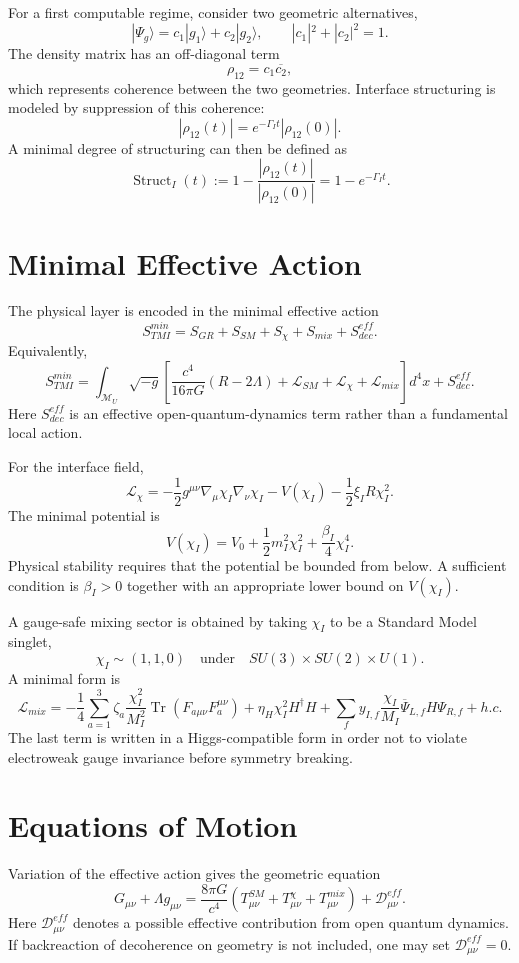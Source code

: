 \documentclass[12pt,a4paper]{article}
\DeclareMathOperator{\Struct}{Struct}
\DeclareMathOperator{\Tr}{Tr}
\newcommand{\M}{\mathcal M_U}
\newcommand{\Lag}{\mathcal L}
\begin{document}
For a first computable regime, consider two geometric alternatives,
\[
|\Psi_g\rangle=c_1|g_1\rangle+c_2|g_2\rangle,
\qquad |c_1|^2+|c_2|^2=1.
\]
The density matrix has an off-diagonal term
\[
\rho_{12}=c_1\overline{c_2},
\]
which represents coherence between the two geometries. Interface structuring is modeled by suppression of this coherence:
\[
\boxed{
|\rho_{12}(t)|=e^{-\Gamma_I t}|\rho_{12}(0)|.
}
\]
A minimal degree of structuring can then be defined as
\[
\boxed{
\Struct_I(t):=1-\frac{|\rho_{12}(t)|}{|\rho_{12}(0)|}=1-e^{-\Gamma_I t}.
}
\]

\section{Minimal Effective Action}
The physical layer is encoded in the minimal effective action
\[
\boxed{
S_{TMI}^{min}=S_{GR}+S_{SM}+S_\chi+S_{mix}+S_{dec}^{eff}.
}
\]
Equivalently,
\[
\boxed{
S_{TMI}^{min}
=
\int_{\M}\sqrt{-g}\left[
\frac{c^4}{16\pi G}(R-2\Lambda)
+\Lag_{SM}+\Lag_\chi+\Lag_{mix}
\right]d^4x
+S_{dec}^{eff}.
}
\]
Here $S_{dec}^{eff}$ is an effective open-quantum-dynamics term rather than a fundamental local action.

For the interface field,
\[
\boxed{
\Lag_\chi
=-\frac12 g^{\mu\nu}\nabla_\mu\chi_I\nabla_\nu\chi_I
-V(\chi_I)-\frac12\xi_I R\chi_I^2.
}
\]
The minimal potential is
\[
\boxed{
V(\chi_I)=V_0+\frac12 m_I^2\chi_I^2+\frac{\beta_I}{4}\chi_I^4.
}
\]
Physical stability requires that the potential be bounded from below. A sufficient condition is $\beta_I>0$ together with an appropriate lower bound on $V(\chi_I)$.

A gauge-safe mixing sector is obtained by taking $\chi_I$ to be a Standard Model singlet,
\[
\chi_I\sim (1,1,0)
\quad \text{under}\quad SU(3)\times SU(2)\times U(1).
\]
A minimal form is
\[
\boxed{
\Lag_{mix}
=
-\frac14\sum_{a=1}^{3}\zeta_a\frac{\chi_I^2}{M_I^2}\Tr(F_{a\mu\nu}F_a^{\mu\nu})
+\eta_H\chi_I^2H^\dagger H
+\sum_f y_{I,f}\frac{\chi_I}{M_I}\overline{\Psi}_{L,f}H\Psi_{R,f}+h.c.
}
\]
The last term is written in a Higgs-compatible form in order not to violate electroweak gauge invariance before symmetry breaking.

\section{Equations of Motion}
Variation of the effective action gives the geometric equation
\[
\boxed{
G_{\mu\nu}+\Lambda g_{\mu\nu}
=
\frac{8\pi G}{c^4}
\left(T_{\mu\nu}^{SM}+T_{\mu\nu}^{\chi}+T_{\mu\nu}^{mix}\right)
+\mathcal D_{\mu\nu}^{eff}.
}
\]
Here $\mathcal D_{\mu\nu}^{eff}$ denotes a possible effective contribution from open quantum dynamics. If backreaction of decoherence on geometry is not included, one may set $\mathcal D_{\mu\nu}^{eff}=0$.
\end{document}
